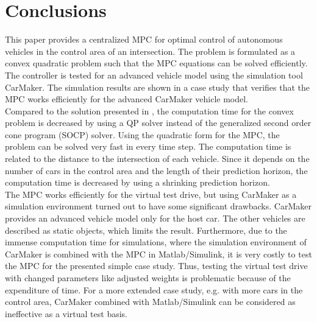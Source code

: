 \documentclass[letterpaper,10pt,conference]{ieeeconf}
\begin{document}
\section{Conclusions} \label{sec:conclusions}
This paper provides a centralized MPC for optimal control of autonomous vehicles in the control area of an intersection. The problem is formulated as a convex quadratic problem such that the MPC equations can be solved efficiently. The controller is tested for an advanced vehicle model using the simulation tool CarMaker. The simulation results are shown in a case study that verifies that the MPC works efficiently for the advanced CarMaker vehicle model.\\ \indent
Compared to the solution presented in \cite{nikolce}, the computation time for the convex problem is decreased by using a QP solver instead of the generalized second order cone program (SOCP) solver. Using the quadratic form for the MPC, the problem can be solved very fast in every time step. The computation time is related to the distance to the intersection of each vehicle. Since it depends on the number of cars in the control area and the length of their prediction horizon, the computation time is decreased by using a shrinking prediction horizon.\\ \indent
The MPC works efficiently for the virtual test drive, but using CarMaker as a simulation environment turned out to have some significant drawbacks. CarMaker provides an advanced vehicle model only for the host car. The other vehicles are described as static objects, which limits the result. Furthermore, due to the immense computation time for simulations, where the simulation environment of CarMaker is combined with the MPC in Matlab/Simulink, it is very costly to test the MPC for the presented simple case study. Thus, testing the virtual test drive with changed parameters like adjusted weights is problematic because of the expenditure of time. For a more extended case study, e.g. with more cars in the control area, CarMaker combined with Matlab/Simulink can be considered as ineffective as a virtual test basis.%
\end{document}
